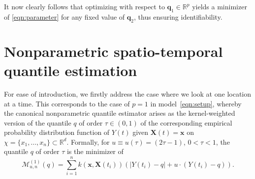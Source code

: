 \documentclass[aos]{imsart}
\theoremstyle{plain}
\theoremstyle{remark}
\def\R{\mathbb{R}}
\newcommand{\bb}[1]{\boldsymbol{#1}}
\begin{document}
It now clearly follows that optimizing with respect to $\bb{q}_1 \in \R^p$ yields a minimizer of \eqref{eqn:parameter} for any fixed value of $\bb{q}_2$, thus ensuring identifiability.

%
\section{Nonparametric spatio-temporal quantile estimation}
\label{Sec:Estimator}


For ease of introduction, we firstly address the case  where we look at one location at a time. This corresponds to the case of $p = 1$ in model~\eqref{eqn:setup}, whereby the canonical nonparametric quantile estimator arises as the kernel-weighted version of the quantile $q$ of order $\tau \in (0,1)$ of the corresponding empirical probability distribution function of $Y(t)$ given $\bb{X}(t) = \bb{x}$ on $\chi= \{x_1, \ldots, x_n\} \subset \R^d$. Formally, for $u\equiv u(\tau) = (2\tau - 1)$, $0 < \tau < 1$, the quantile $q$ of order $\tau$ is the minimizer of 
\begin{equation}\label{EstimatorSimple}
    \mathcal{M}_{u,n}^{(1)}(q)= \sum_{i=1}^n k(\bb{x}, \bb{X}(t_i)) \left( \vert Y(t_i) - q\vert + u \cdot (Y(t_i) - q) \right).
\end{equation}
\end{document}
